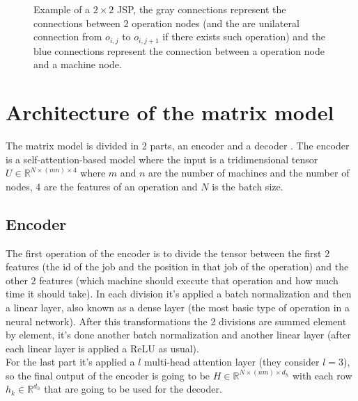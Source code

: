 \documentclass[12pt]{book}
\begin{document}
\begin{figure}[h]
\centering
{}
\caption{Example of a $2\times2$ JSP, the gray connections represent the connections between 2 operation nodes (and the are unilateral connection from $o_{i,j}$ to $o_{i,j+1}$ if there exists such operation) and the blue connections represent the connection between a operation node and a machine node.}
\label{fig:graph_example}
\end{figure}

\section{Architecture of the matrix model}
The matrix model is divided in 2 parts, an encoder and a decoder \cite{LION17}. The encoder is a self-attention-based model where the input is a tridimensional tensor $U\in\mathbb{R}^{N\times(mn)\times4}$ where $m$ and $n$ are the number of machines and the number of nodes, 4 are the features of an operation and $N$ is the batch size.
\subsection{Encoder}
The first operation of the encoder is to divide the tensor between the first 2 features (the id of the job and the position in that job of the operation) and the other 2 features (which machine should execute that operation and how much time it should take). In each division it's applied a batch normalization and then a linear layer, also known as a dense layer (the most basic type of operation in a neural network). After this transformations the 2 divisions are summed element by element, it's done another batch normalization and another linear layer (after each linear layer is applied a ReLU as usual).\\
For the last part it's applied a $l$ multi-head attention layer (they consider $l=3$), so the final output of the encoder is going to be $H\in\mathbb{R}^{N\times(nm)\times d_h}$ with each row $h_k\in\mathbb{R}^{d_h}$ that are going to be used for the decoder.
\end{document}
